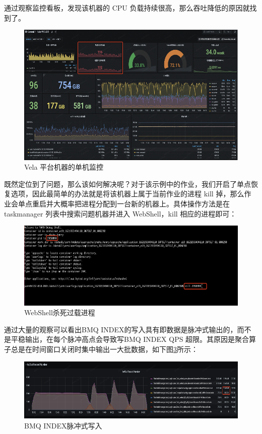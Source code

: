 \begin{longtable}[htbp]
\newpage
通过观察监控看板，发现该机器的 CPU 负载持续很高，那么吞吐降低的原因就找到了。
 \begin{figure}[h]
  \centering
  \includegraphics[width=5in]{figure/chapter6/Vela 平台机器的单机监控.png}
  \caption{Vela 平台机器的单机监控}\label{VelaSingle}
\end{figure}
既然定位到了问题，那么该如何解决呢？对于该示例中的作业，我们开启了单点恢复选项，因此最简单的办法就是将该机器上属于当前作业的进程 kill 掉，那么作业会单点重启并大概率把进程分配到一台新的机器上。具体操作方法是在 taskmanager 列表中搜索问题机器并进入 WebShell，kill 相应的进程即可：
  \begin{figure}[htbp]
  \centering
  \includegraphics[width=5in]{figure/chapter6/WebShell杀死过载进程.png}
  \caption{WebShell杀死过载进程}\label{wellShellKillTask}
\end{figure}

通过大量的观察可以看出BMQ INDEX的写入具有即数据是脉冲式输出的，而不是平稳输出，在每个脉冲高点会导致写BMQ INDEX QPS 超限。其原因是聚合算子总是在时间窗口关闭时集中输出一大批数据，如下图\ref{bmqMaichongWrite}所示：

\begin{figure}[htbp]
  \centering
  \includegraphics[width=5in]{figure/chapter6/BMQ INDEX脉冲式写入.png}
  \caption{BMQ INDEX脉冲式写入}\label{bmqMaichongWrite}
\end{figure}


\end{longtable}
